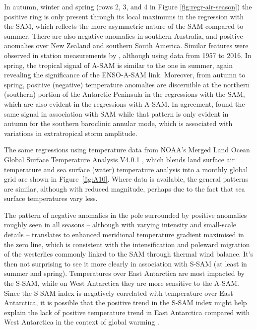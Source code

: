 \documentclass[smallextended]{svjour3}       %
\begin{document}
In autumn, winter and spring (rows 2, 3, and 4 in Figure \ref{fig:regr-air-season}) the positive ring is only present through its local maximums in the regression with the SAM, which reflects the more asymmetric nature of the SAM compared to summer.
There are also negative anomalies in southern Australia, and positive anomalies over New Zealand and southern South America.
Similar features were observed in station measurements by \citet{jones2019}, although using data from 1957 to 2016.
In spring, the tropical signal of A\nobreakdash-SAM is similar to the one in summer, again revealing the significance of the ENSO-A\nobreakdash-SAM link.
Moreover, from autumn to spring, positive (negative) temperature anomalies are discernible at the northern (southern) portion of the Antarctic Peninsula in the regressions with the SAM, which are also evident in the regressions with A-SAM. In agreement, \citet{marshall2016} found the same signal in association with SAM while that pattern is only evident in autumn for the southern baroclinic annular mode, which is associated with variations in extratropical storm amplitude.

The same regressions using temperature data from NOAA's Merged Land Ocean Global Surface Temperature Analysis V4.0.1 \citep{smith2008, vose2012}, which blends land surface air temperature and sea surface (water) temperature analysis into a monthly global grid are shown in Figure~\ref{fig:A10}.
Where data is available, the general patterns are similar, although with reduced magnitude, perhaps due to the fact that sea surface temperatures vary less.

The pattern of negative anomalies in the pole surrounded by positive anomalies roughly seen in all seasons -- although with varying intensity and small-scale details -- translates to enhanced meridional temperature gradient maximised in the zero line, which is consistent with the intensification and poleward migration of the westerlies commonly linked to the SAM through thermal wind balance.
It's then not surprising to see it more clearly in association with S\nobreakdash-SAM (at least in summer and spring).
Temperatures over East Antarctica are most impacted by the S\nobreakdash-SAM, while on West Antarctica they are more sensitive to the A\nobreakdash-SAM.
Since the S\nobreakdash-SAM index is negatively correlated with temperature over East Antarctica, it is possible that the positive trend in the S\nobreakdash-SAM index might help explain the lack of positive temperature trend in East Antarctica compared with West Antarctica in the context of global warming \citep{nicolas2014}.
\end{document}
